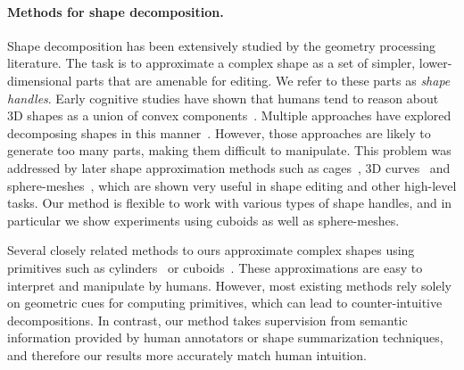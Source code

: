 \paragraph{Methods for shape decomposition.}
Shape decomposition has been extensively studied by the geometry processing
literature. The task is to approximate a complex shape as a set of simpler, lower-dimensional
parts that are amenable for editing. We refer to these parts as \emph{shape handles}. Early cognitive studies have shown that humans tend to reason about 3D shapes as a union
of convex components~\cite{partsrecognition}. Multiple approaches have explored decomposing shapes in this manner~\cite{acd, minimumncd, acanalysis}.
However, those approaches are likely to generate too many parts, making them difficult to manipulate.
This problem was addressed by later shape approximation methods such as cages~\cite{obbcage}, 3D curves~\cite{gsmc_iwires_sig_09,mzlsgm_abstraction_siga_09,Gori2017}
and sphere-meshes~\cite{spheremesh}, which are shown very useful in shape editing and other high-level tasks. Our method is flexible to work with various types of shape handles, and in particular we show experiments using cuboids as well as sphere-meshes.

Several closely related methods to ours approximate complex shapes using
primitives such as cylinders~\cite{gdc} or cuboids~\cite{obbcage}.
These approximations are easy to interpret and manipulate
by humans. However, most existing methods rely solely on geometric cues for computing primitives, which
can lead to counter-intuitive decompositions.
In contrast, our method takes supervision from semantic information provided
by human annotators or shape summarization techniques, 
and therefore our results more accurately match human intuition. 


